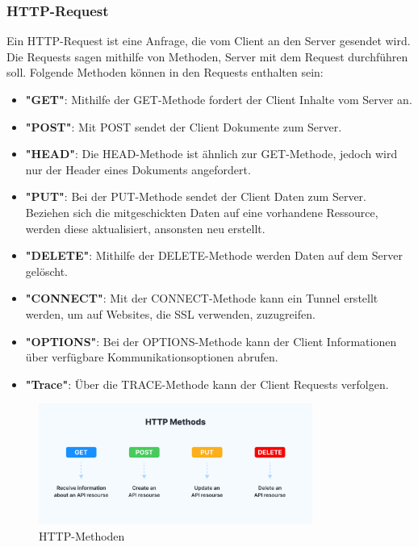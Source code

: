 \subsubsection{HTTP-Request}
Ein HTTP-Request ist eine Anfrage, die vom Client an den Server gesendet wird.
Die Requests sagen mithilfe von Methoden, Server mit dem Request durchführen soll.
\newline
\newline
Folgende Methoden können in den Requests enthalten sein:
\begin{itemize}
  \item \textbf{"GET"}: Mithilfe der GET-Methode
  fordert der Client Inhalte vom Server an.
  \item \textbf{"POST"}: Mit POST sendet der
  Client Dokumente zum Server.
  \item \textbf{"HEAD"}: Die HEAD-Methode ist
  ähnlich zur GET-Methode, jedoch wird nur der Header eines Dokuments angefordert.
  \item \textbf{"PUT"}: Bei der PUT-Methode sendet der Client Daten zum Server.
  Beziehen sich die mitgeschickten Daten auf eine vorhandene Ressource,
  werden diese aktualisiert, ansonsten neu erstellt.
  \item \textbf{"DELETE"}: Mithilfe der
  DELETE-Methode werden Daten auf dem Server gelöscht.
  \item \textbf{"CONNECT"}: Mit der
  CONNECT-Methode kann ein Tunnel erstellt werden, um auf Websites, die SSL verwenden, zuzugreifen.
  \item \textbf{"OPTIONS"}: Bei der
  OPTIONS-Methode kann der Client Informationen über verfügbare Kommunikationsoptionen abrufen.
  \item \textbf{"Trace"}: Über die TRACE-Methode
  kann der Client Requests verfolgen. 
\end{itemize}

\begin{figure}[!htb]
  \includegraphics[width=0.8\textwidth]{pics/funktionsweiseRest.png}
  \centering
  \caption{HTTP-Methoden ~\cite{rest_api_model}}
\end{figure}

